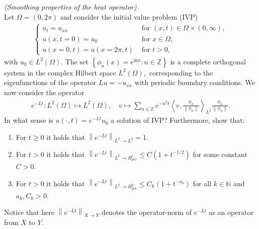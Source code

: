 
\begin{exercise}
\textit{(Smoothing properties of the heat operator)} \\
Let $\Omega=(0,2 \pi)$ and consider the initial value problem (IVP)
\begin{align*}
  \left\{\begin{array}{ll}
  u_{t}=u_{x x} & \text { for } (x, t) \in \Omega \times(0, \infty), \\
  u(x, t=0)=u_{0} & \text { for } x \in \Omega, \\
  u(x=0, t)=u(x=2 \pi, t) & \text { for } t>0,
  \end{array}\right.
\end{align*}
with $u_{0} \in L^{2}(\Omega) .$ The set $\left\{\phi_{n}(x)=e^{\mathrm{in} x}: n \in \mathbb{Z}\right\}$ is a complete orthogonal system in the complex Hilbert space $L^{2}(\Omega),$ corresponding to the eigenfunctions of the operator $L u=-u_{x x}$ with periodic boundary conditions. We now consider the operator
\begin{align*}
  e^{-L t}: L^{2}(\Omega) \mapsto L^{2}(\Omega), \quad
  v \mapsto \sum_{n \in \mathbb{Z}} e^{-n^{2} t}\left\langle v,
  \frac{\phi_{n}}{\left\|\phi_{n}\right\|}\right\rangle_{L^{2}}
  \frac{\phi_{n}}{\left\|\phi_{n}\right\|}.
\end{align*}
In what sense is $u(\cdot, t)=e^{-L t} u_{0}$ a solution of IVP? Furthermore, show that:
\begin{enumerate}[label = (\roman*)]
  \item For $t \geq 0$ it holds that $\left\|e^{-L t}\right\|_{L^{2} \rightarrow L^{2}}=1$.
  \item For $t>0$ it holds that
  $\left\|e^{-L t}\right\|_{L^{2} \rightarrow H_{p e r}^{1}} \leq C\left(1+t^{-1 / 2}\right)$
  for some constant $C>0$.
  \item For $t>0$ it holds that $\left\|e^{-L t}\right\|_{L^{2} \rightarrow H_{\text {per}}^{k}} \leq C_{k}\left(1+t^{-a_{k}}\right)$ for all $k \in \mathbb{N}$ and $a_{k}, C_{k}>0$.
\end{enumerate}
Notice that here $\left\|e^{-L t}\right\|_{X \rightarrow Y}$ denotes the operator-norm of $e^{-L t}$ as an operator from $X$ to $Y$.
\end{exercise}


\begin{solution}

\phantom{}

\end{solution}

